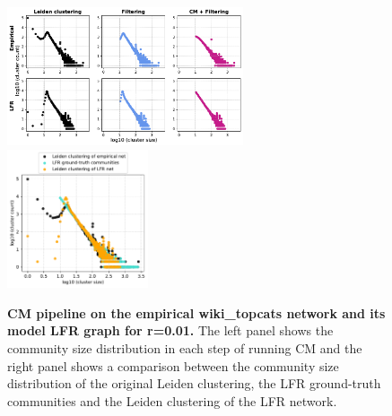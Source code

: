 \documentclass[a4paper]{article}   	%
\begin{document}
\begin{figure}[h!]
\centering
\includegraphics[width=0.62\textwidth]{figs/wiki_topcats_cm_steps_lfr01.pdf}
\includegraphics[width=0.37\textwidth]{figs/wiki_topcats_01_cm_size.pdf}
\caption[CM pipeline on the wiki\_topcats  network and its model LFR graph for r=0.01]{\textbf{CM pipeline on the empirical wiki\_topcats  network and its model LFR graph for r=0.01.} The left panel shows the community size distribution in each step of running CM and the right panel shows a comparison between the community size distribution of the original Leiden clustering, the LFR ground-truth communities and the Leiden clustering of the LFR network.}
\label{fig:wikitopcats-cm-lfr-01}
\end{figure}
\end{document}
